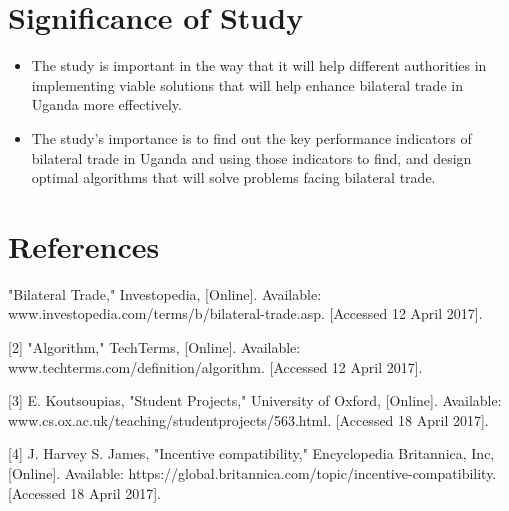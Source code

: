 \documentclass[12pt,a4paper]{article}
\begin{document}
\section{Significance of Study}
\begin{itemize}
\item The study is important in the way that it will help different authorities in implementing viable solutions that will help enhance bilateral trade in Uganda more effectively.
\item The study’s importance is to find out the key performance indicators of bilateral trade in Uganda and using those indicators to find, and design optimal algorithms that will solve problems facing bilateral trade.
\end{itemize}
\section{References}
\begin{bibliography}
[[1] 	"Bilateral Trade," Investopedia, [Online]. Available: www.investopedia.com/terms/b/bilateral-trade.asp. [Accessed 12 April 2017].
	
[2] 	"Algorithm," TechTerms, [Online]. Available: www.techterms.com/definition/algorithm. [Accessed 12 April 2017].
	
[3] 	E. Koutsoupias, "Student Projects," University of Oxford, [Online]. Available: www.cs.ox.ac.uk/teaching/studentprojects/563.html. [Accessed 18 April 2017].
	
[4] 	J. Harvey S. James, "Incentive compatibility," Encyclopedia Britannica, Inc, [Online]. Available: https://global.britannica.com/topic/incentive-compatibility. [Accessed 18 April 2017].	
\end{bibliography}
\end{document}
